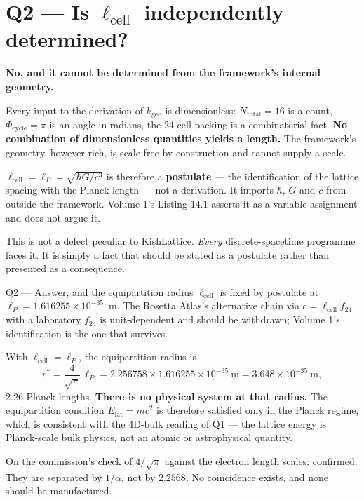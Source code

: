 \documentclass[11pt,letterpaper]{article}
\newcommand{\kgeo}{k_{\mathrm{geo}}}
\newcommand{\lcell}{\ell_{\mathrm{cell}}}
\newcommand{\lP}{\ell_{P}}
\begin{document}
\section{Q2 --- Is $\lcell$ independently determined?}

\begin{negbox}
\textbf{No, and it cannot be determined from the framework's internal geometry.}

\medskip
Every input to the derivation of $\kgeo$ is dimensionless: $N_{\mathrm{total}} = 16$ is a
count, $\Phi_{\mathrm{cycle}} = \pi$ is an angle in radians, the 24-cell packing is a
combinatorial fact. \textbf{No combination of dimensionless quantities yields a length.}
The framework's geometry, however rich, is scale-free by construction and cannot supply a
scale.

\medskip
$\lcell = \lP = \sqrt{\hbar G/c^3}$ is therefore a \textbf{postulate} --- the identification
of the lattice spacing with the Planck length --- not a derivation. It imports $\hbar$, $G$
and $c$ from outside the framework. Volume 1's Listing 14.1 asserts it as a variable
assignment and does not argue it.

\medskip
This is not a defect peculiar to KishLattice. \emph{Every} discrete-spacetime programme
faces it. It is simply a fact that should be stated as a postulate rather than presented as
a consequence.
\end{negbox}

\begin{answerbox}{Q2 --- Answer, and the equipartition radius}
$\lcell$ is fixed by postulate at $\lP = 1.616255\times10^{-35}$~m. The Rosetta Atlas's
alternative chain via $c = \lcell f_{24}$ with a laboratory $f_{24}$ is unit-dependent and
should be withdrawn; Volume 1's identification is the one that survives.

\medskip
With $\lcell = \lP$, the equipartition radius is
\[
r^* = \frac{4}{\sqrt{\pi}}\,\lP = 2.256758 \times 1.616255\times10^{-35}~\mathrm{m}
= 3.648\times10^{-35}~\mathrm{m},
\]
2.26 Planck lengths. \textbf{There is no physical system at that radius.} The equipartition
condition $E_{\mathrm{lat}} = mc^2$ is therefore satisfied only in the Planck regime, which
is consistent with the 4D-bulk reading of Q1 --- the lattice energy is Planck-scale bulk
physics, not an atomic or astrophysical quantity.

\medskip
On the commission's check of $4/\sqrt{\pi}$ against the electron length scales: confirmed.
They are separated by $1/\alpha$, not by $2.2568$. No coincidence exists, and none should be
manufactured.
\end{answerbox}
\end{document}
